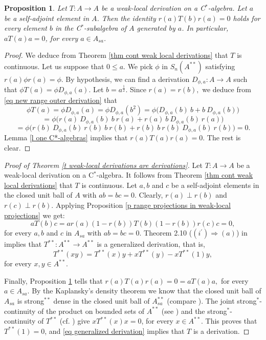 \documentclass[11pt]{amsart}
\newtheorem{proposition}[theorem]{Proposition}
\begin{document}
\begin{proposition}\label{p range projections outer in weak-local projections} Let $T: A\to A$ be a weak-local derivation on a C$^*$-algebra. Let $a$ be a self-adjoint element in $A$. Then the identity $r(a) T (b) r(a) =0$ holds for every element $b$ in the C$^*$-subalgebra of $A$ generated by $a$. In particular, $a T(a) a = 0$, for every $a\in A_{sa}$.
\end{proposition}

\begin{proof} We deduce from Theorem \ref{thm cont weak local derivations} that $T$ is continuous. Let us suppose that $0\leq a$. We pick $\phi$ in $S_{n} (A^{**}) $ satisfying $r(a) \phi r(a)= \phi.$ By hypothesis, we can find a derivation $D_{\phi,a} : A\to A$ such that $\phi T(a) = \phi D_{\phi,a} (a) .$ Let $b= a^{\frac12}.$ Since $r(a) = r(b),$ we deduce from \eqref{eq new range outer derivation} that $$\phi T(a) = \phi D_{\phi,a} (a)  =  \phi D_{\phi,a} (b^2) = \phi \Big(D_{\phi,a} (b) \ b + b\  D_{\phi ,a} (b)\Big)  $$ $$ = \phi \Big(r(a) \ D_{\phi,a} (b)\  b \ r(a)+ r(a)\  b\ D_{\phi ,a} (b)\ r(a)\Big) $$  $$ = \phi \Big(r(b) \ D_{\phi,a} (b)\ r(b)\ b \ r(b)+ r(b)\  b\ r(b)\ D_{\phi ,a} (b)\ r(b)\Big) = 0.$$ Lemma \ref{l one C*-algebras} implies that  $r(a) T (a) r(a) =0.$ The rest is clear.
\end{proof}

\begin{proof}[Proof of Theorem \ref{t weak-local derivations are derivations}] Let $T: A\to A$ be a weak-local derivation on a C$^*$-algebra. It follows from Theorem \ref{thm cont weak local derivations} that $T$ is continuous. Let $a,b$ and $c$ be a self-adjoint elements in the closed unit ball of $A$ with $a b= bc=0$. Clearly, $r(a) \perp r(b)$ and $r(c) \perp r(b)$. Applying Proposition \ref{p range projections in weak-local projections} we get: \begin{equation}\label{equation outers orthogonal} a T(b) c = a r(a) (1-r(b)) T(b) (1-r(b)) r(c) c = 0,
\end{equation} for every $a,b$ and $c$ in $A_{sa}$ with $ab= bc=0$. Theorem 2.10 ($(i^\prime) \Rightarrow (a)$) in \cite{AyuKudPe2014} implies that $T^{**} : A^{**} \to A^{**}$ is a generalized derivation, that is, \begin{equation}\label{eq generalized derivation} T^{**}(x y) = T^{**}(x) y + x T^{**}(y) - x T^{**} (1) y,
\end{equation} for every $x,y\in A^{**}$.\smallskip

Finally, Proposition \ref{p range projections outer in weak-local projections} tells that $r(a) T(a) r(a) =0 = a T(a) a,$ for every $a\in A_{sa}$. By the Kaplansky's density theorem we know that the closed unit ball of $A_{sa}$ is strong$^{**}$ dense in the closed unit ball of $A^{**}_{sa}$ (compare \cite[Theorem 1.9.1]{Sak}). The joint strong$^*$-continuity of the product on bounded sets of $A^{**}$ (see \cite[Proposition 1.8.12]{Sak}) and the strong$^*$-continuity of $T^{**}$ (cf. \cite[Proposition 1.8.10]{Sak}) give $x T^{**} (x) x =0$, for every $x\in A^{**}$. This proves that $T^{**} (1) =0$, and \eqref{eq generalized derivation} implies that $T$ is a derivation.
\end{proof}
\end{document}
